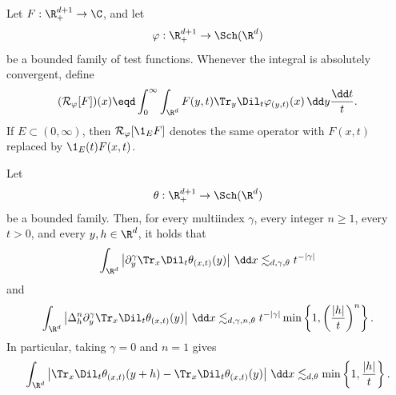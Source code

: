 \begin{definition}
  \label{def:reconstruction-operator}Let $F : \R^{d + 1}_+ \to \C$, and let
  \[ \varphi : \R^{d + 1}_+ \to \Sch (\R^d) \]
  be a bounded family of test functions. Whenever the integral is absolutely
  convergent, define
  \begin{equation}
    \label{eq:reconstruction-operator} (\mathcal{R}_{\varphi} [F]) (x) \eqd
    \int_0^{\infty} \int_{\R^d} F (y, t) \Tr_y \Dil_t \varphi_{(y, t)} (x)
    \hspace{0.17em} \dd y \frac{\dd t}{t} .
  \end{equation}
  If $E \subset (0, \infty)$, then $\mathcal{R}_{\varphi} [\1_E F]$ denotes
  the same operator with $F (x, t)$ replaced by $\1_E (t) F (x, t)$.
\end{definition}

\begin{lemma}
  \label{lem:kernel-bounds}Let
  \[ \theta : \R^{d + 1}_+ \to \Sch (\R^d) \]
  be a bounded family. Then, for every multiindex $\gamma$, every integer $n
  \ge 1$, every $t > 0$, and every $y, h \in \R^d$, it holds that
  \begin{equation}
    \label{eq:kernel-derivative-l1} \int_{\R^d} \left| \partial_y^{\gamma}
    \Tr_x \Dil_t \theta_{(x, t)} (y) \right| \hspace{0.17em} \dd x
    \lesssim_{d, \gamma, \theta} t^{- | \gamma |}
  \end{equation}
  and
  \begin{equation}
    \label{eq:kernel-finite-difference-bound} \int_{\R^d} \left| \Delta_h^n
    \partial_y^{\gamma} \Tr_x \Dil_t \theta_{(x, t)} (y) \right|
    \hspace{0.17em} \dd x \lesssim_{d, \gamma, n, \theta} t^{- | \gamma |}
    \min \left\{ 1, \left( \frac{|h|}{t} \right)^n \right\} .
  \end{equation}
  In particular, taking $\gamma = 0$ and $n = 1$ gives
  \[ \int_{\R^d} \left| \Tr_x \Dil_t \theta_{(x, t)} (y + h) - \Tr_x \Dil_t
     \theta_{(x, t)} (y) \right| \hspace{0.17em} \dd x \lesssim_{d, \theta}
     \min \left\{ 1, \frac{|h|}{t} \right\} . \]
\end{lemma}


